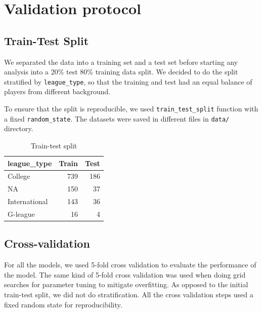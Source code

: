 
\section{Validation protocol}%
\label{sub:validation}

\subsection{Train-Test Split}%

We separated the data into a training set and a test set before starting any analysis
into a 20\% test 80\% training data split. We decided to do the split stratified by
\texttt{league\_type}, so that the training and test had an equal balance of players from
different background.

To ensure that the split is reproducible,
we used \texttt{train\_test\_split} function with a fixed \texttt{random\_state}. The 
datasets were saved in different files in \texttt{data/} directory.

%
\begin{table}[htb]
\centering
\caption{Train-test split}
\label{tab:train-test-split}
\begin{tabular}{lrr}
  \toprule
  \textbf{league\_type} & \textbf{Train} & \textbf{Test} \\
  \midrule
  College        &  739  & 186 \\
  NA             &  150  &  37 \\
  International  &  143  &  36 \\
  G-league       &   16  &   4 \\
  \bottomrule
\end{tabular}
\end{table}

\subsection{Cross-validation}%
\label{ssub:cross-validation}

For all the models, we used 5-fold cross validation to evaluate the performance
of the model. The same kind of 5-fold cross validation was used when doing grid
searches for parameter tuning to mitigate overfitting. As opposed to the initial
train-test split, we did not do stratification. All the cross validation steps
used a fixed random state for reproducibility.

